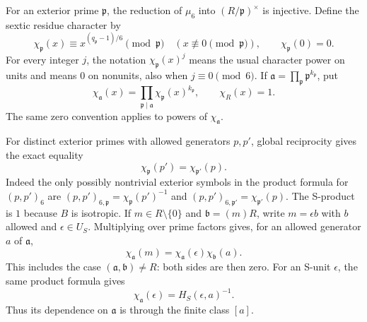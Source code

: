 For an exterior prime \(\mathfrak p\), the reduction of \(\mu_6\) into
\((R/\mathfrak p)^\times\) is injective.  Define the sextic residue character
by
\[
 \chi_{\mathfrak p}(x)\equiv x^{(q_{\mathfrak p}-1)/6}\pmod{\mathfrak p}
 \quad (x\not\equiv0\pmod{\mathfrak p}),\qquad
 \chi_{\mathfrak p}(0)=0.
\]
For every integer \(j\), the notation \(\chi_{\mathfrak p}(x)^j\) means the
usual character power on units and means \(0\) on nonunits, also when
\(j\equiv0\pmod6\).  If
\(\mathfrak a=\prod_{\mathfrak p}\mathfrak p^{k_{\mathfrak p}}\), put
\[
 \chi_{\mathfrak a}(x)=
 \prod_{\mathfrak p\mid\mathfrak a}
       \chi_{\mathfrak p}(x)^{k_{\mathfrak p}},
 \qquad \chi_R(x)=1.
\]
The same zero convention applies to powers of \(\chi_{\mathfrak a}\).

For distinct exterior primes with allowed generators \(p,p'\), global
reciprocity gives the exact equality
\begin{equation}
 \chi_{\mathfrak p}(p')=\chi_{\mathfrak p'}(p).
\label{eq:sextic-reciprocity}
\end{equation}
Indeed the only possibly nontrivial exterior symbols in the product formula
for \((p,p')_6\) are
\((p,p')_{6,\mathfrak p}=\chi_{\mathfrak p}(p')^{-1}\) and
\((p,p')_{6,\mathfrak p'}=\chi_{\mathfrak p'}(p)\).  The S-product is \(1\)
because \(B\) is isotropic.  If \(m\in R\setminus\{0\}\) and
\(\mathfrak b=(m)R\), write \(m=\epsilon b\)
with \(b\) allowed and \(\epsilon\in U_S\).  Multiplying
 over prime factors gives, for an allowed
generator \(a\) of \(\mathfrak a\),
\begin{equation}
 \chi_{\mathfrak a}(m)
  =\chi_{\mathfrak a}(\epsilon)\chi_{\mathfrak b}(a).
\label{eq:generator-reciprocity}
\end{equation}
This includes the case \((\mathfrak a,\mathfrak b)\ne R\): both sides are
then zero.  For an S-unit \(\epsilon\), the same product formula gives
\begin{equation}
 \chi_{\mathfrak a}(\epsilon)=H_S(\epsilon,a)^{-1}.
\label{eq:unit-symbol}
\end{equation}
Thus its dependence on \(\mathfrak a\) is through the finite class \([a]\).

